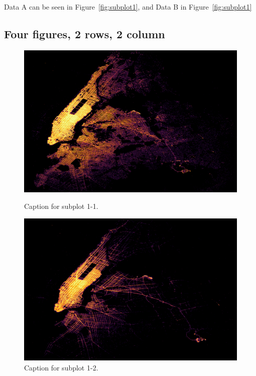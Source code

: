 \documentclass[a4paper, 11pt]{article}
\begin{document}
Data A can be seen in Figure~\ref{fig:subplot1}, and Data B in Figure~\ref{fig:subplot1}

\subsection{Four figures, 2 rows, 2 column}

\begin{figure}[H]%
    \centering

        \begin{minipage}{0.45\textwidth}
            \centering
          \includegraphics[width=\linewidth]{../graphs/subplot11}
          \caption{Caption for subplot 1-1.}
          \label{fig:subplot11}
        \end{minipage}
        \hfill
        \begin{minipage}{0.45\textwidth}
            \centering
          \includegraphics[width=\linewidth]{../graphs/subplot12}
          \caption{Caption for subplot 1-2.}
        \label{fig:subplot12}
        \end{minipage}


\end{figure}
\end{document}
